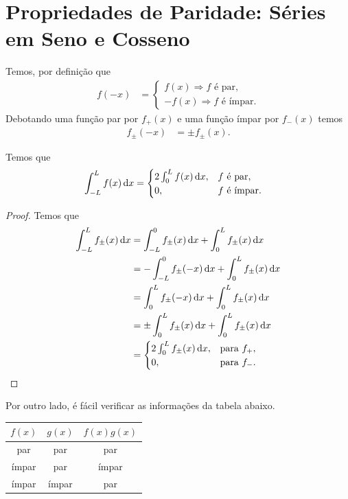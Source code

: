 \section{Propriedades de Paridade: S\'{e}ries em Seno e Cosseno}
Temos, por defini\c{c}\~{a}o que
\begin{align*}
    f(-x) &= \begin{cases}
        f(x) \Rightarrow f \text{ \'{e} par}, \\
        -f(x) \Rightarrow f \text{ \'{e} \'{i}mpar}.
    \end{cases}
\end{align*}
Debotando uma fun\c{c}\~{a}o par por $f_+(x)$ e uma fun\c{c}\~{a}o \'{i}mpar por $f_-(x)$ temos
\begin{align*}
    f_\pm(-x) &= \pm f_\pm(x).
\end{align*}

\begin{prop}
    Temos que
    \begin{align*}
        \int_{-L}^L f(x) \, \mathrm{d}x &= \begin{cases}
            2 \int_0^L f(x) \, \mathrm{d}x, & f \text{ \'{e} par}, \\
            0, & f \text{ \'{e} \'{i}mpar}.
        \end{cases}
    \end{align*}
\end{prop}
\begin{proof}
    Temos que
    \begin{align*}
        \int_{-L}^L f_\pm(x) \, \mathrm{d}x &= \int_{-L}^0 f_\pm(x) \, \mathrm{d}x + \int_0^L f_\pm(x) \, \mathrm{d}x \\
        &= -\int_{-L}^0 f_\pm(-x) \, \mathrm{d}x + \int_0^L f_\pm(x) \, \mathrm{d}x \\
        &= \int_0^L f_\pm(-x) \, \mathrm{d}x + \int_0^L f_\pm(x) \, \mathrm{d}x \\
        &= \pm \int_0^L f_\pm(x) \, \mathrm{d}x + \int_0^L f_\pm(x) \, \mathrm{d}x \\
        &= \begin{cases}
            2 \int_0^L f_\pm(x) \, \mathrm{d}x, & \text{para } f_+, \\
            0, & \text{para } f_-.
        \end{cases} \qedhere
    \end{align*}
\end{proof}

Por outro lado, \'{e} f\'{a}cil verificar as informa\c{c}\~{o}es da tabela abaixo.
\begin{table}[htb]
    \centering
    \begin{tabular}{|c|c|c|}
        \hline
        $f(x)$ & $g(x)$ & $f(x) g(x)$ \\ \hline
        par & par & par \\ \hline
        \'{i}mpar & par & \'{i}mpar \\ \hline
        \'{i}mpar & \'{i}mpar & par \\ \hline
    \end{tabular}
\end{table}

